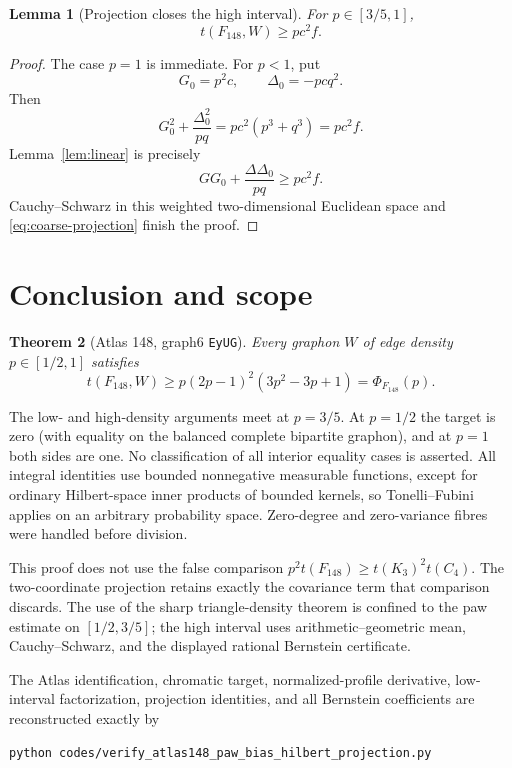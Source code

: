 \documentclass[11pt]{article}
\newtheorem{theorem}{Theorem}[section]
\newtheorem{lemma}[theorem]{Lemma}
\begin{document}
\begin{lemma}[Projection closes the high interval]
For $p\in[3/5,1]$,
\[
 t(F_{148},W)\geq pc^2f.
\]
\end{lemma}

\begin{proof}
The case $p=1$ is immediate.  For $p<1$, put
\[
 G_0=p^2c,\qquad \Delta_0=-pcq^2.
\]
Then
\[
 G_0^2+\frac{\Delta_0^2}{pq}=pc^2(p^3+q^3)=pc^2f.
\]
Lemma~\ref{lem:linear} is precisely
\[
 GG_0+\frac{\Delta\Delta_0}{pq}\geq pc^2f.
\]
Cauchy--Schwarz in this weighted two-dimensional Euclidean space and
\eqref{eq:coarse-projection} finish the proof.
\end{proof}


\section{Conclusion and scope}

\begin{theorem}[Atlas 148, graph6 \texttt{EyUG}]
Every graphon $W$ of edge density $p\in[1/2,1]$ satisfies
\[
 \boxed{
 t(F_{148},W)\geq p(2p-1)^2(3p^2-3p+1)
 =\Phi_{F_{148}}(p).
 }
\]
\end{theorem}

The low- and high-density arguments meet at $p=3/5$.  At $p=1/2$ the
target is zero (with equality on the balanced complete bipartite graphon),
and at $p=1$ both sides are one.  No classification of all interior equality
cases is asserted.  All integral identities use
bounded nonnegative measurable functions, except for ordinary Hilbert-space
inner products of bounded kernels, so Tonelli--Fubini applies on an arbitrary
probability space.  Zero-degree and zero-variance fibres were handled before
division.

This proof does not use the false comparison
$p^2t(F_{148})\geq t(K_3)^2t(C_4)$.  The two-coordinate projection retains
exactly the covariance term that comparison discards.  The use of the sharp
triangle-density theorem is confined to the paw estimate on
$[1/2,3/5]$; the high interval uses arithmetic--geometric mean,
Cauchy--Schwarz, and the displayed rational Bernstein certificate.

The Atlas identification, chromatic target, normalized-profile derivative,
low-interval factorization, projection identities, and all Bernstein
coefficients are reconstructed exactly by
\begin{verbatim}
python codes/verify_atlas148_paw_bias_hilbert_projection.py
\end{verbatim}
\end{document}
